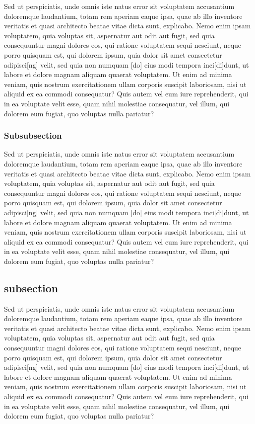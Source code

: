 \documentclass[a4paper,11pt]{article}
\begin{document}
Sed ut perspiciatis, unde omnis iste natus error sit voluptatem accusantium doloremque laudantium, totam rem aperiam eaque ipsa, quae ab illo inventore veritatis et quasi architecto beatae vitae dicta sunt, explicabo. Nemo enim ipsam voluptatem, quia voluptas sit, aspernatur aut odit aut fugit, sed quia consequuntur magni dolores eos, qui ratione voluptatem sequi nesciunt, neque porro quisquam est, qui dolorem ipsum, quia dolor sit amet consectetur adipisci[ng] velit, sed quia non numquam [do] eius modi tempora inci[di]dunt, ut labore et dolore magnam aliquam quaerat voluptatem. Ut enim ad minima veniam, quis nostrum exercitationem ullam corporis suscipit laboriosam, nisi ut aliquid ex ea commodi consequatur? Quis autem vel eum iure reprehenderit, qui in ea voluptate velit esse, quam nihil molestiae consequatur, vel illum, qui dolorem eum fugiat, quo voluptas nulla pariatur?


\subsubsection{Subsubsection}

Sed ut perspiciatis, unde omnis iste natus error sit voluptatem accusantium doloremque laudantium, totam rem aperiam eaque ipsa, quae ab illo inventore veritatis et quasi architecto beatae vitae dicta sunt, explicabo. Nemo enim ipsam voluptatem, quia voluptas sit, aspernatur aut odit aut fugit, sed quia consequuntur magni dolores eos, qui ratione voluptatem sequi nesciunt, neque porro quisquam est, qui dolorem ipsum, quia dolor sit amet consectetur adipisci[ng] velit, sed quia non numquam [do] eius modi tempora inci[di]dunt, ut labore et dolore magnam aliquam quaerat voluptatem. Ut enim ad minima veniam, quis nostrum exercitationem ullam corporis suscipit laboriosam, nisi ut aliquid ex ea commodi consequatur? Quis autem vel eum iure reprehenderit, qui in ea voluptate velit esse, quam nihil molestiae consequatur, vel illum, qui dolorem eum fugiat, quo voluptas nulla pariatur?


\subsection{subsection}

Sed ut perspiciatis, unde omnis iste natus error sit voluptatem accusantium doloremque laudantium, totam rem aperiam eaque ipsa, quae ab illo inventore veritatis et quasi architecto beatae vitae dicta sunt, explicabo. Nemo enim ipsam voluptatem, quia voluptas sit, aspernatur aut odit aut fugit, sed quia consequuntur magni dolores eos, qui ratione voluptatem sequi nesciunt, neque porro quisquam est, qui dolorem ipsum, quia dolor sit amet consectetur adipisci[ng] velit, sed quia non numquam [do] eius modi tempora inci[di]dunt, ut labore et dolore magnam aliquam quaerat voluptatem. Ut enim ad minima veniam, quis nostrum exercitationem ullam corporis suscipit laboriosam, nisi ut aliquid ex ea commodi consequatur? Quis autem vel eum iure reprehenderit, qui in ea voluptate velit esse, quam nihil molestiae consequatur, vel illum, qui dolorem eum fugiat, quo voluptas nulla pariatur?
\end{document}
